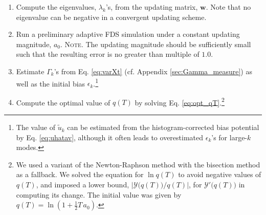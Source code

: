 \documentclass[reprint, superscriptaddress, floatfix]{revtex4-1}
\newcommand{\note}[1]{{\color{DarkGreen}\footnotesize \textsc{Note.} #1}}
\begin{document}
\begin{enumerate}

\item
Compute the eigenvalues, $\lambda_k$'s,
from the updating matrix, $\mathbf w$.
%
Note that
no eigenvalue can be negative in a convergent updating scheme.

\item \label{step:prerun}
Run a preliminary adaptive FDS simulation
under a constant updating magnitude, $a_0$.
%
\note{The updating magnitude should be sufficiently small
  such that the resulting error is no greater than
  multiple of $1.0$.}

\item \label{step:Gamma}
Estimate $\Gamma_k$'s from Eq. \eqref{eq:varXt}
(cf. Appendix \ref{sec:Gamma_measure})
as well as the initial bias $\epsilon_k$.\footnote{The
  value of $\tilde u_k$ can be estimated
  from the histogram-corrected bias potential
  by Eq. \eqref{eq:uhatav},
  although it often leads to overestimated
  $\epsilon_k$'s for large-$k$ modes.
}

\item \label{step:qT}
Compute the optimal value of $q(T)$
by solving Eq. \eqref{eq:opt_qT}.\footnote{We
  used a variant of the Newton-Raphson method\cite{press3rd}
  with the bisection method as a fallback.
  We solved the equation for $\ln q(T)$
  to avoid negative values of $q(T)$,
  and imposed a lower bound,
  $\bigl|\mathcal Y\bigl(q(T)\bigr)/q(T)\bigr|$, for
  $\mathcal Y'\bigl(q(T)\bigr)$
  in computing its change.
  The initial value was given by
  $q(T) = \ln\left(1+\frac{1}{2}T\,a_0\right)$.}
%


\end{enumerate}
\end{document}

